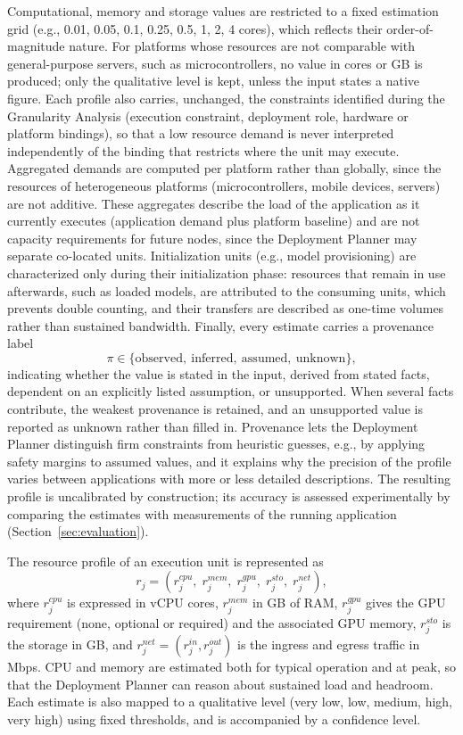 Computational, memory and storage values are restricted to a fixed estimation
grid (e.g., 0.01, 0.05, 0.1, 0.25, 0.5, 1, 2, 4 cores), which reflects their
order-of-magnitude nature. For platforms whose resources are not comparable
with general-purpose servers, such as microcontrollers, no value in cores or GB
is produced; only the qualitative level is kept, unless the input states a
native figure.
Each profile also carries, unchanged, the constraints identified during the
Granularity Analysis (execution constraint, deployment role, hardware or
platform bindings), so that a low resource demand is never interpreted
independently of the binding that restricts where the unit may execute.
Aggregated demands are computed per platform rather than globally, since the
resources of heterogeneous platforms (microcontrollers, mobile devices,
servers) are not additive. These aggregates describe the load of the
application as it currently executes (application demand plus platform
baseline) and are not capacity requirements for future nodes, since the
Deployment Planner may separate co-located units. Initialization units (e.g.,
model provisioning) are characterized only during their initialization phase:
resources that remain in use afterwards, such as loaded models, are attributed
to the consuming units, which prevents double counting, and their transfers
are described as one-time volumes rather than sustained bandwidth. Finally, every estimate carries a provenance label
\begin{equation}
\pi \in \{\mathrm{observed},\ \mathrm{inferred},\ \mathrm{assumed},\ \mathrm{unknown}\},
\end{equation}
indicating whether the value is stated in the input, derived from stated facts,
dependent on an explicitly listed assumption, or unsupported. When several
facts contribute, the weakest provenance is retained, and an unsupported value
is reported as unknown rather than filled in. Provenance lets the Deployment
Planner distinguish firm constraints from heuristic guesses, e.g., by applying
safety margins to assumed values, and it explains why the precision of the
profile varies between applications with more or less detailed descriptions.
The resulting profile is uncalibrated by construction; its accuracy
is assessed experimentally by comparing the estimates with measurements of the
running application (Section~\ref{sec:evaluation}).

The resource profile of an execution unit is represented as
\begin{equation}
r_j = \left( r_j^{cpu},\; r_j^{mem},\; r_j^{gpu},\; r_j^{sto},\; r_j^{net} \right),
\end{equation}
where $r_j^{cpu}$ is expressed in vCPU cores, $r_j^{mem}$ in GB of RAM,
$r_j^{gpu}$ gives the GPU requirement (none, optional or required) and the
associated GPU memory, $r_j^{sto}$ is the storage in GB, and
$r_j^{net}=(r_j^{in},r_j^{out})$ is the ingress and egress traffic in Mbps.
CPU and memory are estimated both for typical operation and at peak, so that
the Deployment Planner can reason about sustained load and headroom. Each
estimate is also mapped to a qualitative level
(very low, low, medium, high, very high) using fixed thresholds, and is
accompanied by a confidence level.

